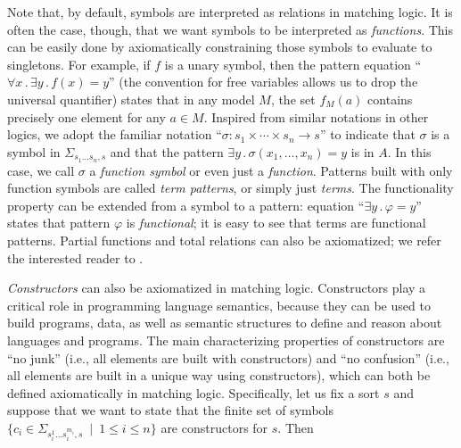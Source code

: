 \documentclass[UTF8,11pt]{article}
\theoremstyle{plain}
\theoremstyle{definition}
\theoremstyle{remark}
\newcommand{\ra}{\rightarrow}
\begin{document}
Note that, by default, symbols are interpreted as relations in matching logic.
It is often the case, though, that we want symbols to be interpreted as
\emph{functions}.
This can be easily done by axiomatically constraining those symbols to evaluate to
singletons.
For example, if $f$ is a unary symbol, then the pattern equation
``$\forall x\,.\,\exists y\,.\,f(x) = y$'' (the convention for free variables
allows us to drop the universal quantifier) states that in any model
$M$, the set $f_M(a)$ contains precisely one element for any $a\in M$.
%
Inspired from similar notations in other logics,
we adopt the familiar notation
``$\sigma : s_1 \times \cdots \times s_n \ra s$''
to indicate that $\sigma$ is a symbol in $\Sigma_{s_1\ldots s_n,s}$ and that
the pattern
$
\exists y\,.\,\sigma(x_1,\ldots,x_n) = y
$ is in $A$.
In this case, we call $\sigma$ a \emph{function symbol} or even just a
\emph{function}.
Patterns built with only function symbols are called
\emph{term patterns}, or simply just \emph{terms}.
The functionality property can be extended from a symbol to
a pattern: equation ``$\exists y\,.\,\varphi = y$'' states that pattern
$\varphi$ is \emph{functional}; it is easy to see that terms are
functional patterns.
Partial functions and total relations can also be axiomatized;
we refer the interested reader to \cite{rosu-2017-lmcs}.

\emph{Constructors} can also be axiomatized in matching logic.
Constructors play a critical role in programming language semantics,
because they can be used to build programs, data, as well as semantic
structures to define and reason about languages and programs.
The main characterizing properties of constructors are ``no junk''
(i.e., all elements are built with constructors) and ``no confusion''
(i.e., all elements are built in a unique way using constructors),
which can both be defined axiomatically in matching logic.
Specifically, let us fix a sort $s$ and suppose that we want to state
that the finite set of symbols
$\{c_i \in \Sigma_{s_i^1...s_i^{m_i},s} \ \mid \ 1 \leq i \leq n\}$
are constructors for $s$.
Then
\end{document}

